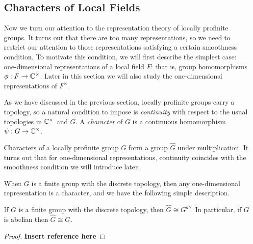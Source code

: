 \subsection{Characters of Local Fields}

Now we turn our attention to the representation theory of locally profinite groups. It turns out that there are too many representations, so we need to restrict our attention to those representations satisfying a certain smoothness condition. To motivate this condition, we will first describe the simplest case: one-dimensional representations of a local field $F$: that is, group homomorphisms $\phi:F\rightarrow\mathbb{C}^{\times}$. Later in this section we will also study the one-dimensional representations of $F^{\times}$.

As we have discussed in the previous section, locally profinite groups carry a topology, so a natural condition to impose is \textit{continuity} with respect to the usual topologies in $\mathbb{C}^{\times}$ and $G$. A \textit{character} of $G$ is a continuous homomorphism $\psi:G\rightarrow\mathbb{C}^{\times}$.

Characters of a locally profinite group $G$ form a group $\hat{G}$ under multiplication. It turns out that for one-dimensional representations, continuity coincides with the smoothness condition we will introduce later. 

When $G$ is a finite group with the discrete topology, then any one-dimensional representation is a character, and we have the following simple description.

\begin{prop}
    If $G$ is a finite group with the discrete topology, then $\hat{G}\cong G^{ab}$. In particular, if $G$ is abelian then $\hat{G}\cong G$.
\end{prop}
\begin{proof}
    \textbf{Insert reference here}
\end{proof}


